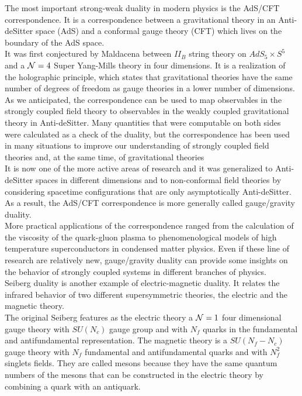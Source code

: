 The most important strong-weak duality in modern physics is the AdS/CFT correspondence. 
It is a correspondence between a gravitational theory in an Anti-deSitter space (AdS) and a conformal gauge theory (CFT) which lives on the boundary of the AdS space. \\
It was first conjectured by Maldacena between $II_B$ string theory on $AdS_5 \times S^5$ and a $\mathcal{N}=4$ Super Yang-Mills theory in four dimensions. 
It is a realization of the holographic principle, which states that gravitational theories have the same number of degrees of freedom as gauge theories in a lower number of dimensions.\\
As we anticipated, the correspondence can be used to map observables in the strongly coupled field theory to observables in the weakly coupled gravitational theory in Anti-deSitter.
Many quantities that were computable on both sides were calculated as a check of the duality, but the correspondence has been used in many situations to improve our understanding of strongly coupled field theories and, at the same time, of gravitational theories \\
It is now one of the more active areas of research and it was generalized to Anti-deSitter spaces in different dimensions and to non-conformal field theories by considering spacetime configurations that are only asymptotically Anti-deSitter.
As a result, the AdS/CFT correspondence is more generally called gauge/gravity duality.  \\
More practical applications of the correspondence ranged from the calculation of the viscosity of the quark-gluon plasma to phenomenological models of high temperature superconductors in condensed matter physics.
Even if these line of research are relatively new, gauge/gravity duality can provide some insights on the behavior of strongly coupled systems in different branches of physics.   
\\ 
Seiberg duality is another example of electric-magnetic duality.
It relates the infrared behavior of two different supersymmetric theories, the electric and the magnetic theory.\\
The  original Seiberg features as the electric theory a $\mathcal{N}=1$ four dimensional gauge theory with $SU(N_c)$ gauge group and with $N_f$ quarks in the fundamental and antifundamental representation.
The magnetic theory is a $SU(N_f-N_c)$ gauge theory with $N_f$ fundamental and antifundamental quarks and with $N_f^2$ singlets fields. 
They are called mesons because they have the same quantum numbers of the mesons that can be constructed in the electric theory by combining a quark with an antiquark. 
